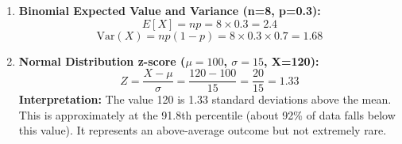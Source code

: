 \begin{enumerate}
    \item \textbf{Binomial Expected Value and Variance (n=8, p=0.3):}
    \begin{equation}
        E[X] = np = 8 \times 0.3 = 2.4
    \end{equation}
    \begin{equation}
        \text{Var}(X) = np(1-p) = 8 \times 0.3 \times 0.7 = 1.68
    \end{equation}
    
    \item \textbf{Normal Distribution z-score ($\mu=100$, $\sigma=15$, X=120):}
    \begin{equation}
        Z = \frac{X - \mu}{\sigma} = \frac{120 - 100}{15} = \frac{20}{15} = 1.33
    \end{equation}
    \textbf{Interpretation:} The value 120 is 1.33 standard deviations above the mean. This is approximately at the 91.8th percentile (about 92\% of data falls below this value). It represents an above-average outcome but not extremely rare.
\end{enumerate}